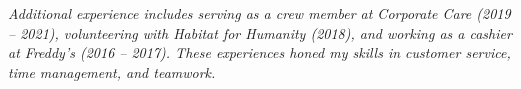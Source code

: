 \sectionspace %


{\small \textit{Additional experience includes serving as a crew member at Corporate Care (2019 – 2021), volunteering with Habitat for Humanity (2018), and working as a cashier at Freddy's (2016 – 2017). These experiences honed my skills in customer service, time management, and teamwork.}}

\sectionspace %

